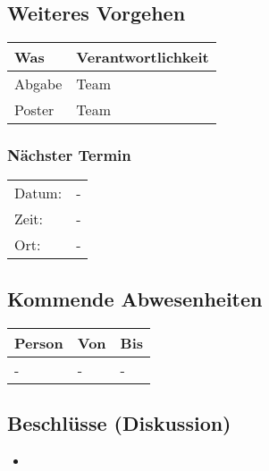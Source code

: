 \vspace{1cm}

\subsection*{Weiteres Vorgehen}
\begin{table}[H]
    \centering
    \begin{tabular}{p{12cm} p{4cm}}
        \textbf{Was} & \textbf{Verantwortlichkeit} \\ \hline
        Abgabe & Team \\ \hline
        Poster & Team \\ \hline
    \end{tabular}
\end{table}

\clearpage

\subsubsection*{Nächster Termin}

\begin{tabular}{p{4cm} p{12cm}}
    Datum: & - \\
    Zeit: & - \\
    Ort: & - \\
\end{tabular}

\vspace{1cm}

\subsection*{Kommende Abwesenheiten}
\begin{table}[H]
    \centering
    \begin{tabular}{p{6cm} p{5cm} p{5cm}}
        \textbf{Person} & \textbf{Von} & \textbf{Bis} \\ \hline
        - & - & - \\ \hline
    \end{tabular}
\end{table}

\vspace{1cm}

\subsection*{Beschlüsse (Diskussion)}
\begin{itemize}
    \item 
\end{itemize}
